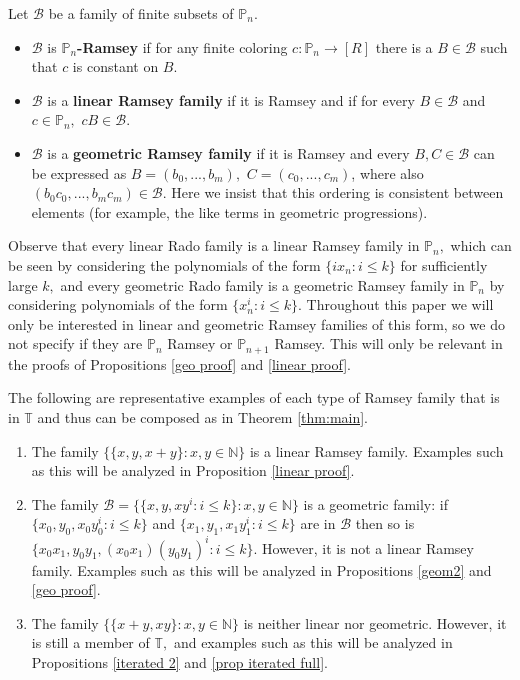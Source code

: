 \documentclass[tocmacros]{daj}
\begin{document}
\begin{definition}\label{def ramsey}
Let $\mathcal{B}$ be a family of finite subsets of $\mathbb{P}_n.$
\begin{itemize}
    \item $\mathcal{B}$ is \textbf{$\mathbb{P}_n$-Ramsey} if for any finite coloring $c:\mathbb{P}_n\rightarrow [R]$ there is a $B\in\mathcal{B}$ such that $c$ is constant on $B.$ 
    \item $\mathcal{B}$ is a \textbf{linear Ramsey family} if it is Ramsey and if for every $B\in\mathcal{B}$ and $c\in \mathbb{P}_n,$ $cB\in \mathcal{B}.$
    \item $\mathcal{B}$ is a \textbf{geometric Ramsey family} if it is Ramsey and every $B,C\in\mathcal{B}$ can be expressed as $B=(b_0,...,b_m),$ $C=(c_0,...,c_m)$, where also $(b_0c_0,...,b_mc_m)\in \mathcal{B}.$ Here we insist that this ordering is consistent between elements (for example, the like terms in geometric progressions).
\end{itemize}
\end{definition}

Observe that every linear Rado family is a linear Ramsey family in $\mathbb{P}_n,$ which can be seen by considering the polynomials of the form $\{ix_{n}: i\leq k\}$ for sufficiently large $k,$ and every geometric Rado family is a geometric Ramsey family in $\mathbb{P}_n$ by considering polynomials of the form $\{x_{n}^i: i\leq k\}.$  Throughout this paper we will only be interested in linear and geometric Ramsey families of this form, so we do not specify if they are $\mathbb{P}_n$ Ramsey or $\mathbb{P}_{n+1}$ Ramsey.  This will only be relevant in the proofs of Propositions \ref{geo proof} and \ref{linear proof}. 

The following are representative examples of each type of Ramsey family that is in $\mathbb{T}$ and thus can be composed as in Theorem \ref{thm:main}.  

\begin{example}

\hspace{2mm}
    \begin{enumerate}
        \item The family $\{\{x,y, x+y\}: x,y\in\mathbb{N}\}$ is a linear Ramsey family.  Examples such as this will be analyzed in Proposition \ref{linear proof}.

        \item The family $\mathcal{B}=\{\{x,y,xy^i: i\leq k\}: x,y\in \mathbb{N}\}$ is a geometric family: if $\{x_0,y_0,x_0y_0^i:i\leq k\}$ and $\{x_1,y_1,x_1y_1^i:i\leq k\}$ are in $\mathcal{B}$ then so is $\{x_0x_1, y_0y_1, (x_0x_1)(y_0y_1)^i: i\leq k\}$.  However, it is not a linear Ramsey family.  Examples such as this will be analyzed in Propositions \ref{geom2} and \ref{geo proof}.

        \item The family $\{\{x+y, xy\}: x,y\in\mathbb{N}\}$ is neither linear nor geometric.  However, it is still a member of $\mathbb{T},$ and examples such as this will be analyzed in Propositions \ref{iterated 2} and \ref{prop iterated full}.  
    \end{enumerate}
\end{example}
\end{document}
